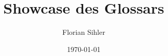 \documentclass{article}
\title{Showcase des Glossars}
\author{Florian Sihler}
\date{\today}
\begin{document}
\maketitle

\glsaddall%
\printglossaries
\end{document}
